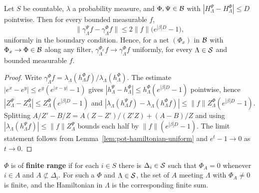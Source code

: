 \begin{proposition}
    \label{prop:pot-gibbs-uniform}
    \leanok

    Let $S$ be countable, $\lambda$ a probability measure, and $\Phi, \Psi \in \mathcal{B}$ with
    $|H^\Psi_\Lambda - H^\Phi_\Lambda| \leq D$ pointwise. Then for every bounded measurable
    $f$,
    \[ \bigl\| \gamma^\Psi_\Lambda f - \gamma^\Phi_\Lambda f \bigr\|
       \leq 2\|f\| \bigl( e^{|\beta| D} - 1 \bigr) , \]
    uniformly in the boundary condition. Hence, for a net $(\Phi_x)$ in $\mathcal{B}$ with
    $\Phi_x \to \Phi \in \mathcal{B}$ along any filter, $\gamma^{\Phi_x}_\Lambda f \to
    \gamma^{\Phi}_\Lambda f$ uniformly, for every $\Lambda \in \mathcal{S}$ and bounded measurable
    $f$.
\end{proposition}
\begin{proof}
    \leanok

    Write $\gamma^\Phi_\Lambda f = \lambda_\Lambda(h^\Phi_\Lambda f) /
    \lambda_\Lambda(h^\Phi_\Lambda)$. The estimate $|e^x - e^y| \leq
    e^{y}(e^{|x-y|} - 1)$ gives $|h^\Psi_\Lambda - h^\Phi_\Lambda| \leq h^\Phi_\Lambda
    (e^{|\beta| D} - 1)$ pointwise, hence $|Z^\Psi_\Lambda - Z^\Phi_\Lambda| \leq
    Z^\Phi_\Lambda (e^{|\beta| D} - 1)$ and $|\lambda_\Lambda(h^\Psi_\Lambda f) -
    \lambda_\Lambda(h^\Phi_\Lambda f)| \leq \|f\| Z^\Phi_\Lambda(e^{|\beta| D} - 1)$.
    Splitting $A/Z' - B/Z = A(Z - Z')/(Z'Z) + (A-B)/Z$ and using
    $|\lambda_\Lambda(h^\Psi_\Lambda f)| \leq \|f\| Z^\Psi_\Lambda$ bounds each half by
    $\|f\|(e^{|\beta| D} - 1)$. The limit statement follows from
    Lemma~\ref{lem:pot-hamiltonian-uniform} and $e^t - 1 \to 0$ as $t \to 0$.
\end{proof}

\begin{definition}
    \label{def:pot-finite-range}
    \leanok

    $\Phi$ is of \textbf{finite range} if for each $i \in S$ there is $\Delta_i \in \mathcal{S}$ such
    that $\Phi_A = 0$ whenever $i \in A$ and $A \not\subset \Delta_i$. For such a $\Phi$ and
    $\Lambda \in \mathcal{S}$, the set of $A$ meeting $\Lambda$ with $\Phi_A \neq 0$ is finite, and
    the Hamiltonian in $\Lambda$ is the corresponding finite sum.
\end{definition}

